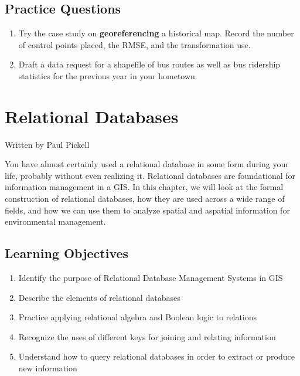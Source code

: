\documentclass[
]{book}
\providecommand{\tightlist}{%
  \setlength{\itemsep}{0pt}\setlength{\parskip}{0pt}}
\begin{document}
\section{Practice Questions}\label{practice-questions-1}

\begin{enumerate}
\def\labelenumi{\arabic{enumi}.}
\tightlist
\item
  Try the case study on \textbf{georeferencing} a historical map. Record the number of control points placed, the RMSE, and the transformation use.
\item
  Draft a data request for a shapefile of bus routes as well as bus ridership statistics for the previous year in your hometown.
\end{enumerate}

\chapter{Relational Databases}\label{relational-databases}

Written by
Paul Pickell

You have almost certainly used a relational database in some form during your life, probably without even realizing it. Relational databases are foundational for information management in a GIS. In this chapter, we will look at the formal construction of relational databases, how they are used across a wide range of fields, and how we can use them to analyze spatial and aspatial information for environmental management.

\section*{Learning Objectives}\label{learning-objectives-4}

\begin{enumerate}
\def\labelenumi{\arabic{enumi}.}
\tightlist
\item
  Identify the purpose of Relational Database Management Systems in GIS
\item
  Describe the elements of relational databases
\item
  Practice applying relational algebra and Boolean logic to relations
\item
  Recognize the uses of different keys for joining and relating information
\item
  Understand how to query relational databases in order to extract or produce new information
\end{enumerate}
\end{document}
